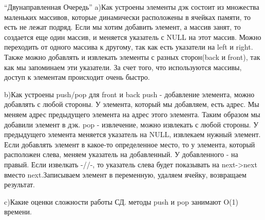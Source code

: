 “Двунаправленная Очередь”
a)Как устроены элементы
дэк состоит из множества маленьких массивов, которые динамически расположены в ячейках памяти, то есть не лежат подряд.
Если мы хотим добавить элемент, а массив занят, то создается еще один массив, и меняется указатель с NULL на этот массив.
Можно переходить от одного массива к другому, так как есть указатели на left и right.
Также можно добавлять и извлекать элементы с разных сторон(back и front), так как мы запоминаем эти указатели. 
За счет того, что используются массивы, доступ к элементам происходит очень быстро. 

b)Как устроены push/pop
для front и back
push - добавление элемента, можно добавлять с любой стороны. 
У элемента, который мы добавляем, есть адрес.
Мы меняем адрес предыдущего элемента на адрес этого элемента. Таким образом мы добавили элемент в дэк.
pop - извлечение, можно извлекать с любой стороны. 
У предыдущего элемента меняется указатель на NULL, извлекаем нужный элемент.
Если добавлять элемент в какое-то определенное место, то у элемента, который расположен слева, меняем указатель на добавленный. У добавленного - на правый.
Если извелкать -//-, то указатель слева будет показывать на next->next вместо next.Записываем элемент в переменную, удаляем ячейку, возвращаем результат.

c)Какие оценки сложности работы СД. 
методы push и pop занимают O(1) времени.